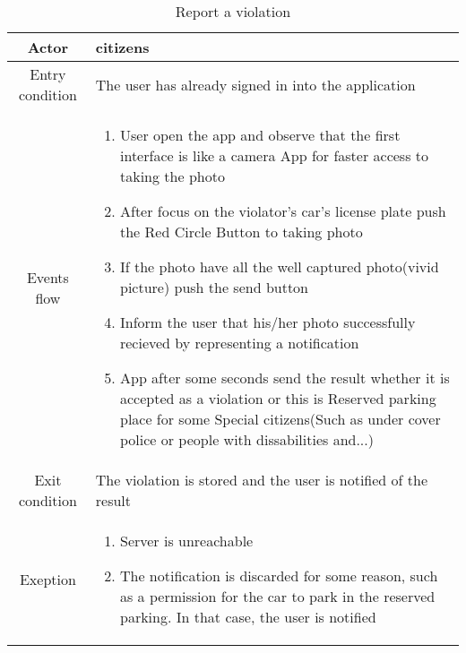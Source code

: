 \documentclass{article}
\begin{document}
		\begin{table} [H]
		\begin{center}
		\caption{Report a violation}
		\begin{tabular}{|c|p{8cm}|}
			\hline
			Actor&citizens\\
			\hline
			Entry condition&The user has already signed in into the application\\
			\hline
			 Events flow& \begin{enumerate}
							\item User open the app and observe that the first interface is like a camera App for faster access to taking the photo			
							\item After focus on the violator's car's license plate push the Red Circle Button to taking photo
							\item If the photo have all the well captured photo(vivid picture) push the send button
							\item Inform the user that his/her photo successfully recieved by representing a notification
							\item App after some seconds send the result whether it is accepted as a violation or this is Reserved parking place for some Special citizens(Such as under cover police or people with dissabilities and...)
						\end{enumerate}\\
			\hline
			Exit condition& The violation is stored and the user is notified of the result\\
			\hline
			Exeption& \begin{enumerate}
						\item Server is unreachable
						\item The notification is discarded for some reason, such as a permission for the car to park in the reserved parking. In that case, the user is notified
					\end{enumerate}\\
			\hline
		\end{tabular}
		\end{center}
		\end{table} 
		
\end{document}
